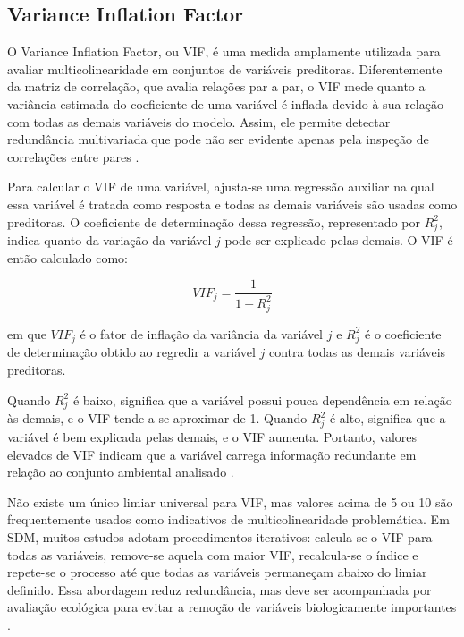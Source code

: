 \subsection{Variance Inflation Factor}

O Variance Inflation Factor, ou VIF, é uma medida amplamente utilizada para avaliar multicolinearidade em conjuntos de variáveis preditoras. Diferentemente da matriz de correlação, que avalia relações par a par, o VIF mede quanto a variância estimada do coeficiente de uma variável é inflada devido à sua relação com todas as demais variáveis do modelo. Assim, ele permite detectar redundância multivariada que pode não ser evidente apenas pela inspeção de correlações entre pares \parencite{dormann2013collinearity,guisan2017habitat}.

Para calcular o VIF de uma variável, ajusta-se uma regressão auxiliar na qual essa variável é tratada como resposta e todas as demais variáveis são usadas como preditoras. O coeficiente de determinação dessa regressão, representado por $R_j^2$, indica quanto da variação da variável $j$ pode ser explicado pelas demais. O VIF é então calculado como:

\begin{equation}
	VIF_j = \frac{1}{1 - R_j^2}
	\label{eq:vif}
\end{equation}

\noindent em que $VIF_j$ é o fator de inflação da variância da variável $j$ e $R_j^2$ é o coeficiente de determinação obtido ao regredir a variável $j$ contra todas as demais variáveis preditoras.

Quando $R_j^2$ é baixo, significa que a variável possui pouca dependência em relação às demais, e o VIF tende a se aproximar de 1. Quando $R_j^2$ é alto, significa que a variável é bem explicada pelas demais, e o VIF aumenta. Portanto, valores elevados de VIF indicam que a variável carrega informação redundante em relação ao conjunto ambiental analisado \parencite{dormann2013collinearity}.

Não existe um único limiar universal para VIF, mas valores acima de 5 ou 10 são frequentemente usados como indicativos de multicolinearidade problemática. Em SDM, muitos estudos adotam procedimentos iterativos: calcula-se o VIF para todas as variáveis, remove-se aquela com maior VIF, recalcula-se o índice e repete-se o processo até que todas as variáveis permaneçam abaixo do limiar definido. Essa abordagem reduz redundância, mas deve ser acompanhada por avaliação ecológica para evitar a remoção de variáveis biologicamente importantes \parencite{guisan2017habitat,zurell2020standard}.

